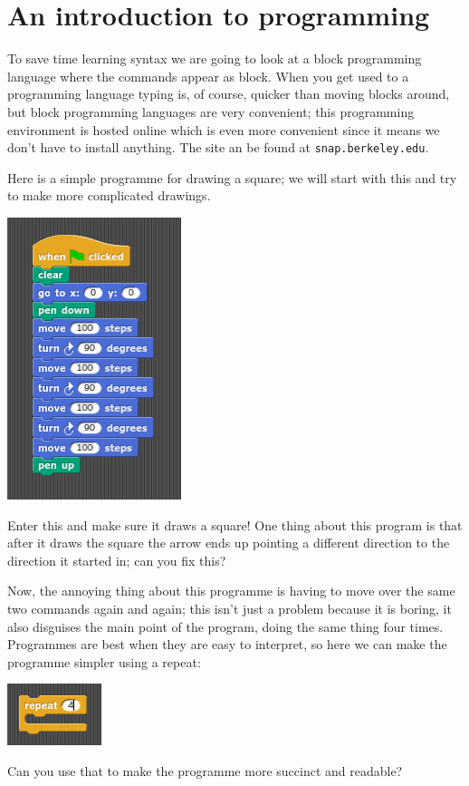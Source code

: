 \documentclass[11pt,a4paper]{scrartcl}
\begin{document}
\section*{An introduction to programming}

To save time learning syntax we are going to look at a block
programming language where the commands appear as block. When you get
used to a programming language typing is, of course, quicker than
moving blocks around, but block programming languages are very
convenient; this programming environment is hosted online which is
even more convenient since it means we don't have to install
anything. The site an be found at \texttt{snap.berkeley.edu}.

Here is a simple programme for drawing a square; we will start with
this and try to make more complicated drawings.
\begin{center}
\includegraphics{basic_square.png}
\end{center}
Enter this and make sure it draws a square! One thing about this
program is that after it draws the square the arrow ends up pointing a
different direction to the direction it started in; can you fix this?

Now, the annoying thing about this programme is having to move over
the same two commands again and again; this isn't just a problem
because it is boring, it also disguises the main point of the program,
doing the same thing four times. Programmes are best when they are easy to interpret, so here we can make the programme simpler using a repeat:
\begin{center}
\includegraphics{repeat.png}
\end{center}
Can you use that to make the programme more succinct and readable? 
\end{document}
